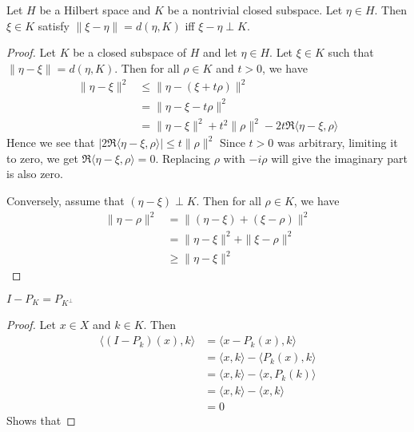 
\chapter{}

\begin{lemma}
  Let $H$ be a Hilbert space and $K$ be a nontrivial closed subspace.
  Let $\eta \in H$. Then $\xi \in K$ satisfy $\|\xi - \eta\| = d(\eta, K)$ iff
  $\xi - \eta \perp K$.
\end{lemma}
\begin{proof}
  Let $K$ be a closed subspace of $H$ and let $\eta \in H$. Let $\xi
  \in K$ such that $\|\eta - \xi\|= d(\eta, K)$. Then for all $\rho
  \in K$ and $t > 0$, we have
  \begin{align*}
    \|\eta - \xi\|^2 &\le \|\eta - (\xi + t\rho)\|^2  \\
    & = \| \eta - \xi -  t\rho\|^2 \\
    & = \|\eta - \xi\|^2 + t^2\|\rho\|^2 - 2t\Re \langle \eta - \xi ,
    \rho \rangle
  \end{align*}
  Hence we see that $|2\Re \langle \eta - \xi , \rho \rangle| \le t\|\rho\|^2$
  Since $t>0$ was arbitrary, limiting it to zero, we get $\Re \langle
  \eta - \xi ,  \rho \rangle = 0$. Replacing $\rho$ with $-i \rho$
  will give the imaginary part is also zero.

  Conversely, assume that $(\eta - \xi) \perp K$. Then  for all $\rho
  \in K$, we have
  \begin{align*}
    \|\eta - \rho\|^2 &= \|(\eta - \xi) + (\xi - \rho)\|^2 \\
    & = \|\eta - \xi\|^2 + \|\xi - \rho\|^2 \\
    & \ge \|\eta  - \xi\|^2
  \end{align*}
\end{proof}

\begin{proposition}
  $I-P_K = P_{K^\perp}$
\end{proposition}
\begin{proof}
  Let $x \in X$ and $k \in K$. Then
  \begin{align*}
    \langle (I - P_k)(x), k \rangle &= \langle  x - P_k(x) , k \rangle \\
    &= \langle  x , k \rangle - \langle P_k(x) ,  k \rangle  \\
    &= \langle x , k \rangle  - \langle x , P_k(k) \rangle \\
    &= \langle x , k \rangle  - \langle  x , k \rangle  \\
    &= 0
  \end{align*}
  Shows that
\end{proof}

